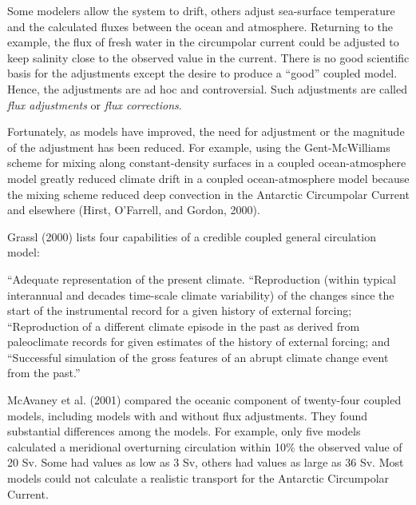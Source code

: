 Some modelers allow the system to drift, others adjust sea-surface temperature and the
calculated fluxes between the ocean and atmosphere. Returning to the example, the flux of
fresh water in the circumpolar current could be adjusted to keep salinity close to the
observed value in the current. There is no good scientific basis for the adjustments except
the desire to  produce a ``good'' coupled model. Hence, the adjustments are ad hoc and 
controversial. Such adjustments are called \textit{flux adjustments} or \textit{flux corrections}.

Fortunately, as models have improved, the need for adjustment or the magnitude
of the adjustment has been reduced. For example, using the Gent-McWilliams scheme
for mixing along constant-density
surfaces in a coupled ocean-atmosphere model greatly reduced climate drift in a coupled
ocean-atmos\-phere model because the mixing scheme reduced
deep convection in the Antarctic Circumpolar Current and elsewhere (Hirst, O'Farrell, and Gordon, 2000).

Grassl (2000) lists four capabilities of a credible coupled general
circulation model:
\begin{enumerate}
\vitem
``Adequate representation of the present climate.
\vitem
``Reproduction (within typical interannual and decades time-scale climate
variability) of the changes since the start of the instrumental record for a
given history of external forcing;
\vitem
``Reproduction of a different climate episode in the past as derived from paleoclimate
records for given estimates of the history of external forcing; and
\vitem
``Successful simulation of the gross features of an abrupt climate change event
from the past.''
\end{enumerate}

McAvaney et al. (2001) compared the oceanic component of twenty-four coupled models, including models with and without flux adjustments. They found substantial differences among the models. For example, only five models calculated a meridional overturning circulation within 10\% the observed value of 20 Sv. Some had values as low as 3 Sv, others had values as large as 36 Sv. Most models could not calculate a realistic transport for the Antarctic
Circumpolar Current.

